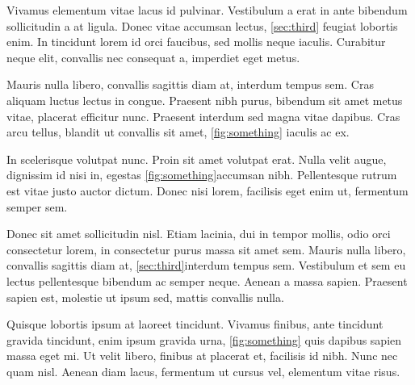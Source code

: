 Vivamus elementum vitae lacus id pulvinar. Vestibulum a erat in ante bibendum sollicitudin a at ligula. 
Donec vitae accumsan lectus, \ref{sec:third} feugiat lobortis enim. 
In tincidunt lorem id orci faucibus, sed mollis neque iaculis.
Curabitur neque elit, convallis nec consequat a, imperdiet eget metus.

\label{fig:something}

Mauris nulla libero, convallis sagittis diam at, interdum tempus sem. Cras aliquam luctus lectus in congue.
Praesent nibh purus, bibendum sit amet metus vitae, placerat efficitur nunc.
Praesent interdum sed magna vitae dapibus. Cras arcu tellus,
blandit ut convallis sit amet, \autoref{fig:something} iaculis ac ex.

In scelerisque volutpat nunc. Proin sit amet volutpat erat. Nulla velit augue,
dignissim id nisi in, egestas \autoref{fig:something}accumsan nibh.
Pellentesque rutrum est vitae justo auctor dictum. Donec nisi lorem,
facilisis eget enim ut, fermentum semper sem.

Donec sit amet sollicitudin nisl. Etiam lacinia, dui in tempor mollis, 
odio orci consectetur lorem, in consectetur purus massa sit amet sem. 
Mauris nulla libero, convallis sagittis diam at, \ref{sec:third}interdum tempus sem. 
Vestibulum et sem eu lectus pellentesque bibendum ac semper neque. 
Aenean a massa sapien. Praesent sapien est, molestie ut ipsum sed, 
mattis convallis nulla.
\label{fig:second}

Quisque lobortis ipsum at laoreet tincidunt. Vivamus finibus, 
ante tincidunt gravida tincidunt, enim ipsum gravida urna, 
\autoref{fig:something} quis dapibus sapien massa eget mi. 
Ut velit libero, finibus at placerat et, facilisis id nibh. 
Nunc nec quam nisl. Aenean diam lacus, fermentum ut cursus vel, 
elementum vitae risus. \label{sec:third}
